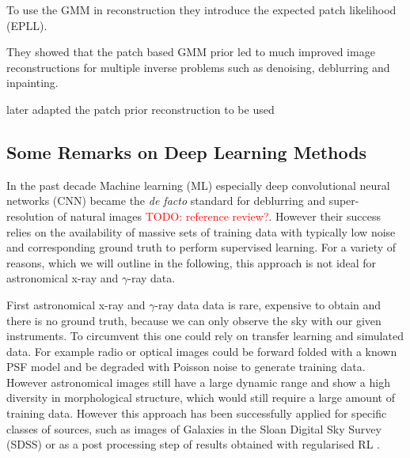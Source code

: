 \documentclass[twocolumn]{aastex631}
\newcommand{\gammaray}{$\gamma$-ray\xspace}
\newcommand{\todo}[1]{\textcolor{red}{TODO: #1}\PackageWarning{TODO:}{#1!}}
\begin{document}
    To use the GMM in reconstruction they introduce the expected patch likelihood (EPLL). 
    
    They showed that the patch based GMM prior led to much improved image reconstructions for multiple inverse problems such as denoising, deblurring and inpainting.

    \cite{Bouman2016} later adapted the patch prior reconstruction to be used
    
    

    \subsection{Some Remarks on Deep Learning Methods}
    In the past decade Machine learning (ML) especially deep convolutional neural networks (CNN) became the \textit{de facto} standard for deblurring and super-resolution of natural images \todo{reference review?}. However their success relies on the availability of massive sets of training data with typically low noise and corresponding ground truth to perform supervised learning. For a variety of reasons, which we will outline in the following, this approach is not ideal for astronomical x-ray and \gammaray data.
    
    First astronomical x-ray and \gammaray data data is rare, expensive to obtain and there is no ground truth, because we can only observe the sky with our given instruments. To circumvent this one could rely on transfer learning and simulated data. For example radio or optical images could be forward folded with a known PSF model and be degraded with Poisson noise to generate training data. However astronomical images still have a large dynamic range and show a high diversity in morphological structure, which would still require a large amount of training data. However this approach has been successfully applied for specific classes of sources, such as images of Galaxies in the Sloan Digital Sky Survey (SDSS) \citep{Schawinski2017} or as a post processing step of results obtained with regularised RL \citep{Akhaury2022}.
\end{document}
